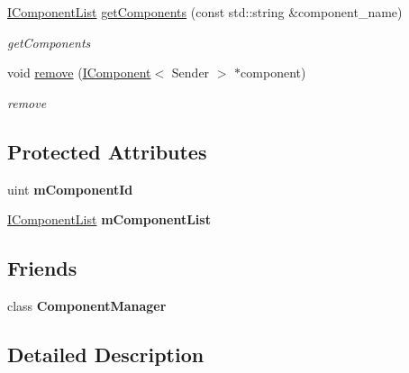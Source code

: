 \begin{DoxyCompactItemize}
\hyperlink{classEngine_1_1IComponent_aade5c1f3aa7ac594acc104861fc761c4}{I\+Component\+List} \hyperlink{classEngine_1_1IComponent_a30089eee0f95d222bed42c59e6615f05}{get\+Components} (const std\+::string \&component\+\_\+name)
\begin{DoxyCompactList}\small\item\em get\+Components \end{DoxyCompactList}\item 
void \hyperlink{classEngine_1_1IComponent_ae1ebe49fd115e2776a250ff11e94caf4}{remove} (\hyperlink{classEngine_1_1IComponent}{I\+Component}$<$ Sender $>$ $\ast$component)
\begin{DoxyCompactList}\small\item\em remove \end{DoxyCompactList}\end{DoxyCompactItemize}
\subsection*{Protected Attributes}
\begin{DoxyCompactItemize}
\item 
\hypertarget{classEngine_1_1IComponent_aec9a0ccb4f8e2df57615c2e26822cc43}{}uint {\bfseries m\+Component\+Id}\label{classEngine_1_1IComponent_aec9a0ccb4f8e2df57615c2e26822cc43}

\item 
\hypertarget{classEngine_1_1IComponent_a5eb3918b4b630214ba60af5d205c3515}{}\hyperlink{classEngine_1_1IComponent_aade5c1f3aa7ac594acc104861fc761c4}{I\+Component\+List} {\bfseries m\+Component\+List}\label{classEngine_1_1IComponent_a5eb3918b4b630214ba60af5d205c3515}

\end{DoxyCompactItemize}
\subsection*{Friends}
\begin{DoxyCompactItemize}
\item 
\hypertarget{classEngine_1_1IComponent_a4542618ef05fbb881e9783ae3755240a}{}class {\bfseries Component\+Manager}\label{classEngine_1_1IComponent_a4542618ef05fbb881e9783ae3755240a}

\end{DoxyCompactItemize}


\subsection{Detailed Description}
